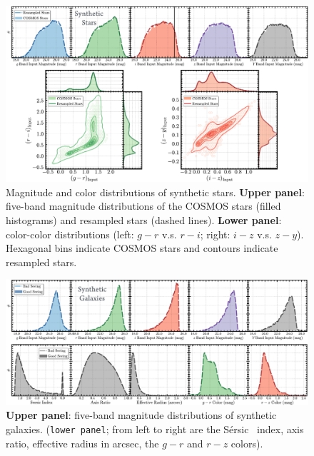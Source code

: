 \documentclass[useamsfonts]{pasj01}
\def\ser{{S\'{e}rsic\ }}
\begin{document}
\begin{figure}
    \begin{center}
        \includegraphics[width=\textwidth]{fig/synpipe_star_sample}
    \end{center}
    \caption{
        Magnitude and color distributions of synthetic stars.
        \textbf{Upper panel}: five-band magnitude distributions of the COSMOS
        stars (filled histograms) and  resampled stars (dashed lines).
        \textbf{Lower panel}: color-color distributions
        (left: $g-r$ v.s. $r-i$; right: $i-z$ v.s. $z-y$). 
        Hexagonal bins indicate COSMOS stars and contours indicate resampled stars.
        }
    \label{fig:star_sample}
\end{figure}

\begin{figure}
    \begin{center}
        \includegraphics[width=\textwidth]{fig/synpipe_galaxy_sample}
    \end{center}
    \caption{
         \textbf{Upper panel}: five-band magnitude distributions of synthetic
         galaxies. (\texttt{lower panel}; from left to right are the \ser{} index, 
         axis ratio, effective radius in arcsec, the $g-r$ and $r-z$ colors).
         }
    \label{fig:galaxy_sample}
\end{figure}
\end{document}
